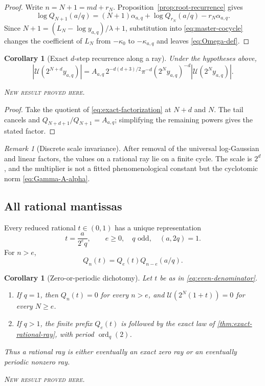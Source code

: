 \documentclass[11pt,oneside]{article}
\newtheorem{corollary}[theorem]{Corollary}
\theoremstyle{definition}
\theoremstyle{remark}
\newtheorem{remark}[theorem]{Remark}
\newcommand{\ord}{\operatorname{ord}}
\newcommand{\newresult}{\textcolor{newgreen}{\textsc{New result proved here.}}}
\begin{document}
\begin{proof}
Write $n=N+1=md+r_N$. Proposition~\ref{prop:root-recurrence} gives
\[
 \log Q_{N+1}(a/q)
 =(N+1)\alpha_{a,q}+
 \log Q_{r_N}(a/q)-r_N\alpha_{a,q}.
\]
Since $N+1=(L_N-\log y_{a,q})/\lambda+1$, substitution into
\eqref{eq:master-cocycle} changes the coefficient of $L_N$ from $-\kappa_0$ to
$-\kappa_{a,q}$ and leaves \eqref{eq:Omega-def}.
\end{proof}

\begin{corollary}[Exact $d$-step recurrence along a ray]\label{cor:d-step-ray}
Under the hypotheses above,
\begin{equation}
 \boxed{
 |\mathscr U(2^{N+d}y_{a,q})|
 =A_{a,q}\,2^{-d(d+3)/2}\pi^{-d}(2^Ny_{a,q})^{-d}
 |\mathscr U(2^Ny_{a,q})|.}
 \label{eq:d-step-ray}
\end{equation}

\smallskip\noindent\newresult
\end{corollary}

\begin{proof}
Take the quotient of \eqref{eq:exact-factorization} at $N+d$ and $N$. The tail
cancels and $Q_{N+d+1}/Q_{N+1}=A_{a,q}$; simplifying the remaining powers gives
the stated factor.
\end{proof}

\begin{remark}[Discrete scale invariance]
After removal of the universal log-Gaussian and linear factors, the values on a
rational ray lie on a finite cycle. The scale is $2^d$, and the multiplier is not a
fitted phenomenological constant but the cyclotomic norm \eqref{eq:Gamma-A-alpha}.
\end{remark}

\subsection{All rational mantissas}

Every reduced rational $t\in(0,1)$ has a unique representation
\begin{equation}
 t=\frac{a}{2^eq},\qquad e\ge0,\quad q\text{ odd},\quad(a,2q)=1.
 \label{eq:even-denominator}
\end{equation}
For $n>e$,
\begin{equation}
 Q_n(t)=Q_e(t)Q_{n-e}(a/q).
 \label{eq:preperiod-Q}
\end{equation}

\begin{corollary}[Zero-or-periodic dichotomy]\label{cor:all-rational-rays}
Let $t$ be as in \eqref{eq:even-denominator}.
\begin{enumerate}
 \item If $q=1$, then $Q_n(t)=0$ for every $n>e$, and
 $\mathscr U(2^N(1+t))=0$ for every $N\ge e$.
 \item If $q>1$, the finite prefix $Q_e(t)$ is followed by the exact law of
 \cref{thm:exact-rational-ray}, with period $\ord_q(2)$.
\end{enumerate}
Thus a rational ray is either eventually an exact zero ray or an eventually
periodic nonzero ray.

\smallskip\noindent\newresult
\end{corollary}
\end{document}
